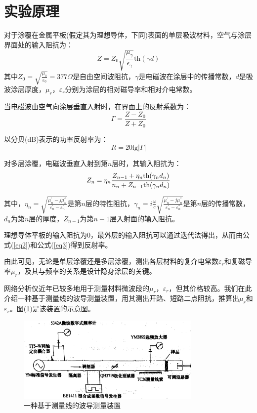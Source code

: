 \documentclass[a4paper]{article}
\begin{document}
\section{实验原理}
对于涂覆在金属平板(假定其为理想导体，下同)表面的单层吸波材料，空气与涂层界面处的输入阻抗为：
\begin{equation}
	Z=Z_0\sqrt{\frac{\mu_\gamma}{\epsilon_\gamma}}\text{th}(\gamma d)\label{eq1}
\end{equation}
其中$Z_0 = \sqrt{\frac{\mu_0}{\varepsilon_0}} = 377\Omega$是自由空间波阻抗，$\gamma$是电磁波在涂层中的传播常数，$d$是吸波涂层厚度，$\mu_r$，$\varepsilon_r$分别为涂层的相对磁导率和相对介电常数。

当电磁波由空气向涂层垂直入射时，在界面上的反射系数为：
\begin{equation}
	\Gamma=\frac{Z-Z_0}{Z+Z_0}\label{eq2}
\end{equation}

以分贝(dB)表示的功率反射率为：
\begin{equation}
	R=20\text{lg}|\Gamma|\label{eq3}
\end{equation}

对多层涂覆，电磁波垂直入射到第$n$层时，其输入阻抗为：
\begin{equation}
	Z_n=\eta_n\frac{Z_{n-1}+\eta_n\text{th}(\gamma_nd_n)}{n_n+Z_{n-1}\text{th}(\gamma_nd_n)}\label{eq4}
\end{equation}

其中，$\eta_n = \sqrt{\frac{\mu_n^{'} - j\mu_n^{''}}{\varepsilon_n^{'} - \varepsilon_n^{''}}}$是第$n$层的特性阻抗，$\gamma_n = i\frac{\omega}{c}\sqrt{\frac{\mu_n^{'} - j\mu_n^{''}}{\varepsilon_n^{'} - \varepsilon_n^{''}}}$是第$n$层的传播常数，$d_n$为第$n$层的厚度，$Z_{n-1}$为第$n-1$层入射面的输入阻抗。

理想导体平板的输入阻抗为0，最外层的输入阻抗可以通过迭代法得出，从而由公式(\ref{eq2})和公式(\ref{eq3})得到反射率。

由此可见，无论是单层涂覆还是多层涂覆，测出各层材料的复介电常数$\varepsilon_r$和复磁导率$\mu_r$，及其与频率的关系是设计隐身涂层的关键。

网络分析仪近年已较多地用于测量材料微波段的$\mu_r$，$\varepsilon_r$，但其价格较高。我们在此介绍一种基于测量线的波导测量装置，用其测出开路、短路二点阻抗，推算出$\mu_r$和$\varepsilon_r$。图(\ref{fig1})是该装置的示意图。
\begin{figure}[!h]
	\centering
	\includegraphics[width=0.8\textwidth]{fig/fig1.png}
	\caption{一种基于测量线的波导测量装置}\label{fig1}
\end{figure}
\end{document}
